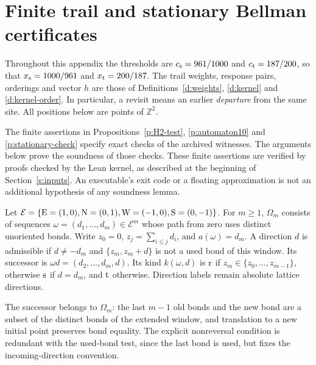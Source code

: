 
\section{Finite trail and stationary Bellman certificates}

Throughout this appendix the thresholds are
\(c_{\rm s}=961/1000\) and \(c_{\rm t}=187/200\), so that
\(x_{\rm s}=1000/961\) and \(x_{\rm t}=200/187\).
The trail weights, response pairs, orderings and vector \(h\) are
those of Definitions~\ref{d:weights}, \ref{d:kernel} and
\ref{d:kernel-order}. In particular, a revisit means an earlier
\emph{departure} from the same site. All positions below are points
of \(\mathbb Z^2\).

The finite assertions in Propositions~\ref{p:H2-test},
\ref{p:automaton10} and \ref{p:stationary-check} specify exact checks
of the archived witnesses. The arguments below prove the soundness
of those checks. These finite assertions are verified by proofs
checked by the Lean kernel, as described at the beginning of
Section~\ref{s:inputs}. An executable's exit
code or a floating approximation is not an additional hypothesis of
any soundness lemma.

\begin{definition}\label{d:memory-automaton}
Let \(\mathcal E=\{{\rm E}=(1,0),{\rm N}=(0,1),
{\rm W}=(-1,0),{\rm S}=(0,-1)\}\).
For \(m\ge1\), \(\Omega_m\) consists of sequences
\(\omega=(d_1,\ldots,d_m)\in\mathcal E^m\) whose path from zero
uses distinct unoriented bonds. Write \(z_0=0\),
\(z_j=\sum_{i\le j}d_i\), and \(a(\omega)=d_m\).
A direction \(d\) is admissible if \(d\ne-d_m\) and
\(\{z_m,z_m+d\}\) is not a used bond of this window.
Its successor is \(\omega d=(d_2,\ldots,d_m,d)\).
Its kind \(k(\omega,d)\) is \({\rm r}\) if
\(z_m\in\{z_0,\ldots,z_{m-1}\}\), otherwise \({\rm s}\)
if \(d=d_m\), and \({\rm t}\) otherwise.
Direction labels remain absolute lattice directions.
\end{definition}

The successor belongs to \(\Omega_m\): the last \(m-1\) old bonds
and the new bond are a subset of the distinct bonds of the extended
window, and translation to a new initial point preserves bond equality.
The explicit nonreversal condition is redundant with the used-bond
test, since the last bond is used, but fixes the incoming-direction
convention.

